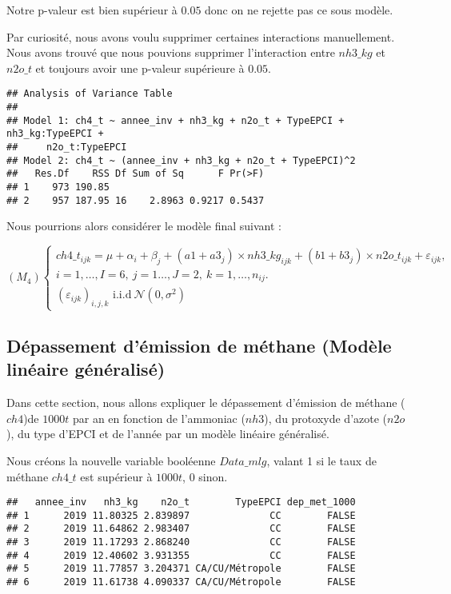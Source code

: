 \documentclass[
]{article}
\begin{document}
Notre p-valeur est bien supérieur à \(0.05\) donc on ne rejette pas ce
sous modèle.

Par curiosité, nous avons voulu supprimer certaines interactions
manuellement. Nous avons trouvé que nous pouvions supprimer
l'interaction entre \(nh3\_kg\) et \(n2o\_t\) et toujours avoir une
p-valeur supérieure à \(0.05\).

\begin{verbatim}
## Analysis of Variance Table
## 
## Model 1: ch4_t ~ annee_inv + nh3_kg + n2o_t + TypeEPCI + nh3_kg:TypeEPCI + 
##     n2o_t:TypeEPCI
## Model 2: ch4_t ~ (annee_inv + nh3_kg + n2o_t + TypeEPCI)^2
##   Res.Df    RSS Df Sum of Sq      F Pr(>F)
## 1    973 190.85                           
## 2    957 187.95 16    2.8963 0.9217 0.5437
\end{verbatim}

Nous pourrions alors considérer le modèle final suivant :

\[
(M_4) 
\left\{\begin{array}{l} ch4\_t_{ijk}= \mu + \alpha_i + \beta_j + (a1 + a3_j)\times nh3\_kg_{ijk} + (b1 + b3_j)\times n2o\_t_{ijk} +
\varepsilon_{ijk},\ \\
i=1,\ldots,I=6,\ j=1 \ldots,J=2, \ k=1,\ldots,n_{ij}.\\ (\varepsilon_{ijk})_{i,j,k} \textrm{ i.i.d
} \ \mathcal{N}(0,\sigma^2) \end{array}\right. 
\]

\hypertarget{duxe9passement-duxe9mission-de-muxe9thane-moduxe8le-linuxe9aire-guxe9nuxe9ralisuxe9}{%
\subsection{Dépassement d'émission de méthane (Modèle linéaire
généralisé)}\label{duxe9passement-duxe9mission-de-muxe9thane-moduxe8le-linuxe9aire-guxe9nuxe9ralisuxe9}}

Dans cette section, nous allons expliquer le dépassement d'émission de
méthane (\(ch4\))de \(1000t\) par an en fonction de l'ammoniac
(\(nh3\)), du protoxyde d'azote (\(n2o\)), du type d'EPCI et de l'année
par un modèle linéaire généralisé.

Nous créons la nouvelle variable booléenne \(Data\_mlg\), valant 1 si le
taux de méthane \(ch4\_t\) est supérieur à \(1000t\), 0 sinon.

\begin{verbatim}
##   annee_inv   nh3_kg    n2o_t        TypeEPCI dep_met_1000
## 1      2019 11.80325 2.839897              CC        FALSE
## 2      2019 11.64862 2.983407              CC        FALSE
## 3      2019 11.17293 2.868240              CC        FALSE
## 4      2019 12.40602 3.931355              CC        FALSE
## 5      2019 11.77857 3.204371 CA/CU/Métropole        FALSE
## 6      2019 11.61738 4.090337 CA/CU/Métropole        FALSE
\end{verbatim}
\end{document}
